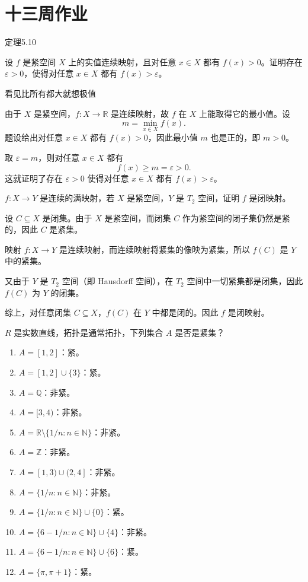\section{十三周作业}
定理5.10
\begin{homework}[5.5]
设 $f$ 是紧空间 $X$ 上的实值连续映射，且对任意 $x\in X$ 都有 $f(x)>0$。证明存在 $\varepsilon>0$，使得对任意 $x\in X$ 都有 $f(x)>\varepsilon$。
\end{homework}
\begin{dxtips}
    看见比所有都大就想极值
\end{dxtips}
\begin{solution}
由于 $X$ 是紧空间，$f:X\to\mathbb{R}$ 是连续映射，故 $f$ 在 $X$ 上能取得它的最小值。设
\[
m=\min_{x\in X} f(x).
\]
题设给出对任意 $x\in X$ 都有 $f(x)>0$，因此最小值 $m$ 也是正的，即 $m>0$。

取 $\varepsilon=m$，则对任意 $x\in X$ 都有
\[
f(x)\ge m=\varepsilon>0.
\]
这就证明了存在 $\varepsilon>0$ 使得对任意 $x\in X$ 都有 $f(x)>\varepsilon$。
\end{solution}
\begin{homework}
[10] $f:X\to Y$ 是连续的满映射，若 $X$ 是紧空间，$Y$ 是 $T_2$ 空间，证明 $f$ 是闭映射。
\end{homework}
\begin{solution}
设 $C\subseteq X$ 是闭集。由于 $X$ 是紧空间，而闭集 $C$ 作为紧空间的闭子集仍然是紧的，因此 $C$ 是紧集。

映射 $f:X\to Y$ 是连续映射，而连续映射将紧集的像映为紧集，所以 $f(C)$ 是 $Y$ 中的紧集。

又由于 $Y$ 是 $T_2$ 空间（即 Hausdorff 空间），在 $T_2$ 空间中一切紧集都是闭集，因此 $f(C)$ 为 $Y$ 的闭集。

综上，对任意闭集 $C\subseteq X$，$f(C)$ 在 $Y$ 中都是闭的。因此 $f$ 是闭映射。
\end{solution}
\begin{homework}
[11]$R$ 是实数直线，拓扑是通常拓扑，下列集合 $A$ 是否是紧集？

\begin{enumerate}
  \item $A=[1,2]$：紧。
  \item $A=[1,2]\cup\{3\}$：紧。
  \item $A=\mathbb{Q}$：非紧。
  \item $A=[3,4)$：非紧。
  \item $A=\mathbb{R}\setminus\{1/n:n\in\mathbb{N}\}$：非紧。
  \item $A=\mathbb{Z}$：非紧。
  \item $A=[1,3)\cup(2,4]$：非紧。
  \item $A=\{1/n:n\in\mathbb{N}\}$：非紧。
  \item $A=\{1/n:n\in\mathbb{N}\}\cup\{0\}$：紧。
  \item $A=\{6-1/n:n\in\mathbb{N}\}\cup\{4\}$：非紧。
  \item $A=\{6-1/n:n\in\mathbb{N}\}\cup\{6\}$：紧。
  \item $A=\{\pi,\pi+1\}$：紧。
\end{enumerate}
\end{homework}
